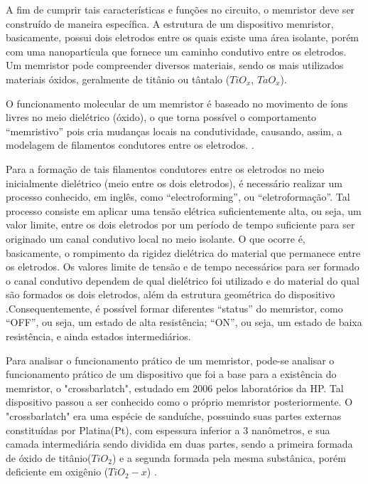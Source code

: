 \documentclass{ceel}
\begin{document}
\begin{multicols}{2}
A fim de cumprir tais características e funções no circuito, o memristor deve ser construído de maneira específica. A estrutura de um dispositivo memristor, basicamente, possui dois eletrodos entre os quais existe uma área isolante, porém com uma nanopartícula que fornece um caminho condutivo entre os eletrodos. %
Um memristor pode compreender diversos materiais, sendo os mais utilizados materiais óxidos, geralmente de titânio ou tântalo \cite{us} ($TiO_x$, $TaO_x$).

O funcionamento molecular de um memristor é baseado no movimento de íons livres no meio dielétrico (óxido), o que torna possível o comportamento “memristivo” pois cria mudanças locais na condutividade, causando, assim, a modelagem de filamentos condutores entre os eletrodos. \cite{us}. %

Para a formação de tais filamentos condutores entre os eletrodos no meio inicialmente dielétrico (meio entre os dois eletrodos), é necessário realizar um processo conhecido, em inglês, como “electroforming”, ou “eletroformação”. Tal %
processo consiste em aplicar uma tensão elétrica suficientemente alta, ou seja, um valor limite, entre os dois eletrodos por um período de tempo suficiente para ser originado um canal condutivo local no meio isolante. O que ocorre é, basicamente, o rompimento da rigidez dielétrica do material que permanece entre os eletrodos. %
Os valores limite de tensão e de tempo necessários para ser formado o canal condutivo dependem de qual dielétrico foi utilizado e do material do qual são formados os dois eletrodos, além da estrutura geométrica do dispositivo \cite{us}.Consequentemente, é possível formar diferentes “status” do memristor, como “OFF”, ou seja, um estado de alta resistência; “ON”, ou seja, um estado de baixa resistência, e ainda estados intermediários. %

Para analisar o funcionamento prático de um memristor, pode-se analisar o funcionamento prático de um dispositivo que foi a base para a existência do memristor, o "crossbarlatch", estudado em 2006 pelos %
laboratórios da HP. Tal dispositivo passou a ser conhecido como o próprio memristor posteriormente. O "crossbarlatch" era uma espécie de sanduíche, possuindo suas partes externas constituídas por Platina(Pt), com espessura inferior a 3 nanômetros, e sua camada intermediária sendo dividida em duas partes, sendo a primeira formada de óxido de titânio($TiO_2$) e a segunda formada pela mesma substânica, porém deficiente em oxigênio ($TiO_2-x$) \cite{construcao}.  


\end{multicols}
\end{document}
